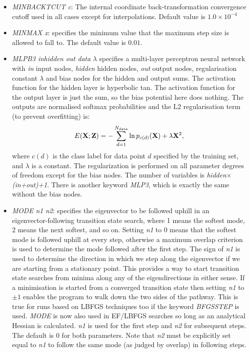 \documentclass[12pt,a4paper,dvips]{article}
\begin{document}
\begin{itemize}
\item {\it MINBACKTCUT c\/}: The internal coordinate back-transformation
  convergence cutoff used in all cases except for interpolations. Default
  value is $1.0\times10^{-4}$

\item {\it MINMAX x\/}: specifies the minimum value that the maximum step size 
is allowed to fall to. The default value is $0.01$.


\item {\it MLPB3 inhidden out data $\lambda$} specifies a multi-layer perceptron neural network
with {\it in} input nodes, {\it hidden} hidden nodes, {\it out} output nodes, regularisation constant
$\lambda$ and bias nodes for the hidden and output sums.
The activation function for the hidden layer is hyperbolic tan.
The activation function for the output layer is just the sum, so the
bias potential here does nothing.
The outputs are normalised softmax probabilities and the
L2 regularisation term (to prevent overfitting) is:
\begin{equation}
E({\bf X};{\bf Z}) = -\sum_{d=1}^{N_{\rm data}} \ln p_{c(d)}({\bf X}) + \lambda {\bf X}^2,
\end{equation}
where $c(d)$ is the class label for data point $d$ specified by the training set,
and $\lambda$ is a constant.
The regularization is performed on all parameter degrees of freedom except for the bias nodes.
The number of variables is {\it hidden$\times$(in+out)+1}. There is another keyword
{\it MLP3}, which is exactly the same without the bias nodes.

\item {\it MODE n1 n2\/}: specifies the eigenvector to be followed uphill in an eigenvector-following 
transition state search,
where 1 means the softest mode, 2 means the next softest, and so on.
Setting {\it n1\/} to 0 means that the softest mode is followed uphill at every step,
otherwise a maximum overlap criterion is used to determine the mode followed after the
first step. The sign of {\it n1\/} is used to determine the direction in which we
step along the eigenvector if we are starting from a stationary point. This provides a way
to start transition state searches from minima along any of the eigendirections in
either sense. If a minimisation is started from a converged transition state then setting
{\it n1\/} to $\pm1$ enables the program to walk down the two sides of the pathway. This is true for
runs based on LBFGS techniques too if the keyword {\it BFGSSTEP\/} is used.
{\it MODE\/} is now also used in EF/LBFGS searches so long as an analytical Hessian is
calculated. {\it n1\/} is used for the first step and {\it n2} for subsequent steps. The
default is 0 for both parameters. Note that {\it n2\/} must be explicitly set equal to
{\it n1\/} to follow the same mode (as judged by overlap) in following steps.


\end{itemize}
\end{document}
